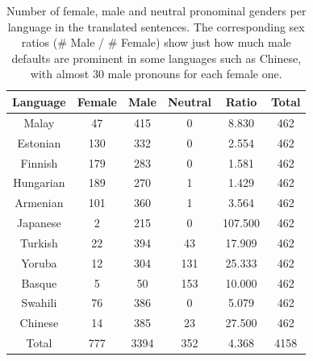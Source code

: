 \documentclass[jair,twoside,11pt,theapa]{article}
\begin{document}
\begin{table}[H]
  \centering
  \begin{tabular}{|c|c|c|c|c|c|}
  \hline
  Language & Female & Male & Neutral & Ratio & Total \\ \hline
  \hline
  Malay     & 47  & 415  & 0   & 8.830  & 462 \\ \hline
  Estonian  & 130 & 332  & 0   & 2.554  & 462 \\ \hline
  Finnish   & 179 & 283  & 0   & 1.581  & 462 \\ \hline
  Hungarian & 189 & 270  & 1   & 1.429  & 462 \\ \hline
  Armenian  & 101 & 360  & 1   & 3.564  & 462 \\ \hline
  Japanese  & 2   & 215  & 0   & 107.500  & 462 \\ \hline
  Turkish   & 22  & 394  & 43  & 17.909 & 462 \\ \hline
  Yoruba    & 12  & 304  & 131 & 25.333 & 462 \\ \hline
  Basque    & 5   & 50   & 153 & 10.000   & 462 \\ \hline
  Swahili   & 76  & 386  & 0   & 5.079  & 462 \\ \hline
  Chinese   & 14  & 385  & 23  & 27.500   & 462 \\ \hline
  \hline
  Total     & 777 & 3394 & 352 & 4.368  & 4158   \\ \hline
  \end{tabular}
  \caption{Number of female, male and neutral pronominal genders per language in the translated sentences. The corresponding sex ratios (\# Male / \# Female) show just how much male defaults are prominent in some languages such as Chinese, with almost 30 male pronouns for each female one.}
  \label{tab:gender-by-language}
\end{table}
\end{document}
